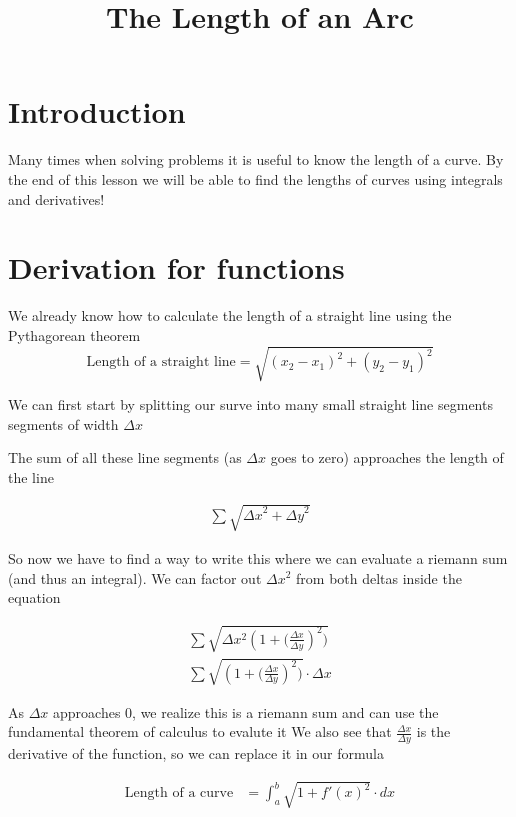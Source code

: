 \documentclass[10pt]{extarticle}
\title{The Length of an Arc}
\makeatletter
\renewcommand{\maketitle}{
  \begin{center}
    {\Huge \@title}
    \vspace{0cm} %
  \end{center}
}
\makeatother
\begin{document}
\thispagestyle{empty}
\maketitle



\hrulefill

\section{Introduction}
Many times when solving problems it is useful to know the length of a curve. By the end of this lesson we will be able to find the lengths of curves using integrals and derivatives!

\section{Derivation for functions}

We already know how to calculate the length of a straight line using the Pythagorean theorem
\begin{equation}
    \text{Length of a straight line} = \sqrt{(x_2 - x_1)^2 + (y_2 - y_1)^2}
\end{equation}

We can first start by splitting our surve into many small straight line segments segments of width $\Delta x$

The sum of all these line segments (as $\Delta x$ goes to zero) approaches the length of the line 

\begin{align}
    \sum \sqrt{{\Delta x}^2 + {\Delta y}^2}
\end{align}

So now we have to find a way to write this where we can evaluate a riemann sum (and thus an integral).
We can factor out $\Delta x^2$ from both deltas inside the equation

\begin{align}   
    \sum \sqrt{{\Delta x^2}(1 + {(\frac{\Delta x}{\Delta y}})^2)} \\
    \sum \sqrt{(1 + {(\frac{\Delta x}{\Delta y}})^2)} \cdot \Delta x
\end{align}

As $\Delta x$ approaches 0, we realize this is a riemann sum and can use the fundamental theorem of calculus to evalute it 
We also see that $\frac{\Delta x}{\Delta y}$ is the derivative of the function, so we can replace it in our formula

\begin{align}
    \text{Length of a curve} &= \int_{a}^{b} \sqrt{1 + f'(x)^2} \cdot dx
\end{align}
\end{document}
